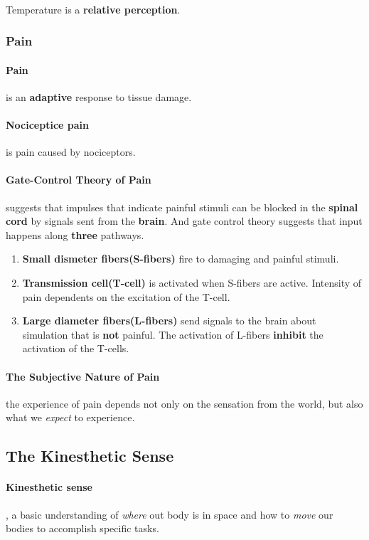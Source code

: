 \documentclass{article}
\begin{document}
	\paragraph{}Temperature is a \textbf{relative perception}.
	\subsubsection{Pain}
	\paragraph{Pain} is an \textbf{adaptive} response to tissue damage.
	\paragraph{Nociceptice pain} is pain caused by nociceptors.
	\paragraph{Gate-Control Theory of Pain} suggests that impulses that indicate painful stimuli can be blocked in the \textbf{spinal cord} by signals sent from the \textbf{brain}. And gate control theory suggests that input happens along \textbf{three} pathways.
	\begin{enumerate}
		\item \textbf{Small dismeter fibers(S-fibers)} fire to damaging and painful stimuli.
		\item \textbf{Transmission cell(T-cell)} is activated when S-fibers are active. Intensity of pain dependents on the excitation of the T-cell.
		\item \textbf{Large diameter fibers(L-fibers)} send signals to the brain about simulation that is \textbf{not} painful. The activation of L-fibers \textbf{inhibit} the activation of the T-cells.
	\end{enumerate}
	\paragraph{The Subjective Nature of Pain} the experience of pain depends not only on the sensation from the world, but also what we \emph{expect} to experience.
	\subsection{The Kinesthetic Sense}
	\paragraph{Kinesthetic sense}, a basic understanding of \emph{where} out body is in space and how to \emph{move} our bodies to accomplish specific tasks.
\end{document}
